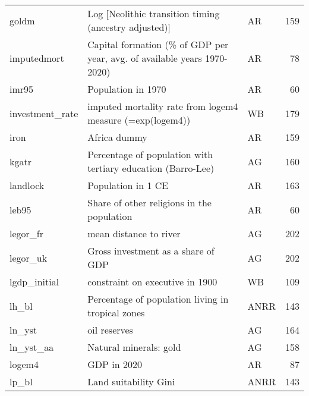 \begin{tabular}{lllr}
goldm                          &                     Log [Neolithic transition timing (ancestry adjusted)] &     AR &   159 \\
imputedmort                    &  Capital formation (\% of GDP per year, avg. of available years 1970-2020) &     AR &    78 \\
imr95                          &                                                        Population in 1970 &     AR &    60 \\
investment\_rate                &                 imputed mortality rate from logem4 measure (=exp(logem4)) &     WB &   179 \\
iron                           &                                                              Africa dummy &     AR &   159 \\
kgatr                          &              Percentage of population with tertiary education (Barro-Lee) &     AG &   160 \\
landlock                       &                                                        Population in 1 CE &     AR &   163 \\
leb95                          &                                Share of other religions in the population &     AR &    60 \\
legor\_fr                       &                                                    mean distance to river &     AG &   202 \\
legor\_uk                       &                                        Gross investment as a share of GDP &     AG &   202 \\
lgdp\_initial                   &                                           constraint on executive in 1900 &     WB &   109 \\
lh\_bl                          &                         Percentage of population living in tropical zones &   ANRR &   143 \\
ln\_yst                         &                                                             oil reserves  &     AG &   164 \\
ln\_yst\_aa                      &                                                    Natural minerals: gold &     AG &   158 \\
logem4                         &                                                               GDP in 2020 &     AR &    87 \\
lp\_bl                          &                                                     Land suitability Gini &   ANRR &   143 \\

\end{tabular}
